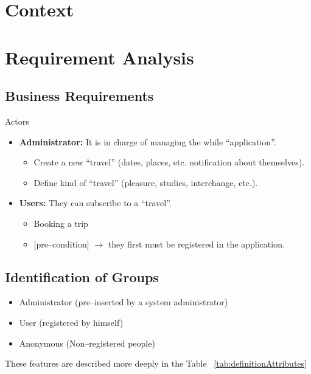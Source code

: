 \documentclass[a4paper]{memoir}
\begin{document}
\section{Context}
\section{Requirement Analysis}
	\subsection{Business Requirements}
		Actors
		\begin{itemize}
			\item \textbf{Administrator:} It is in charge of managing the while ``application''.
				\begin{itemize}
					\item Create a new ``travel'' (dates, places, etc. notification about themselves).
					\item Define kind of ``travel'' (pleasure, studies, interchange, etc.).
				\end{itemize}
			\item \textbf{Users:} They can subscribe to a ``travel''.
				\begin{itemize}
					\item Booking a trip
					\item $[$pre--condition$]$ $\rightarrow$ they first must be registered in the application.
				\end{itemize}
		\end{itemize}
	\subsection{Identification of Groups}
		\label{subsec:Identification of Group}
		\begin{itemize}
			\item Administrator (pre--inserted by a system administrator)
			\item User (registered by himself)
			\item Anonymous (Non--registered people)
		\end{itemize}
		These features are described more deeply in the Table ~\ref{tab:definitionAttributes}
		
\end{document}
